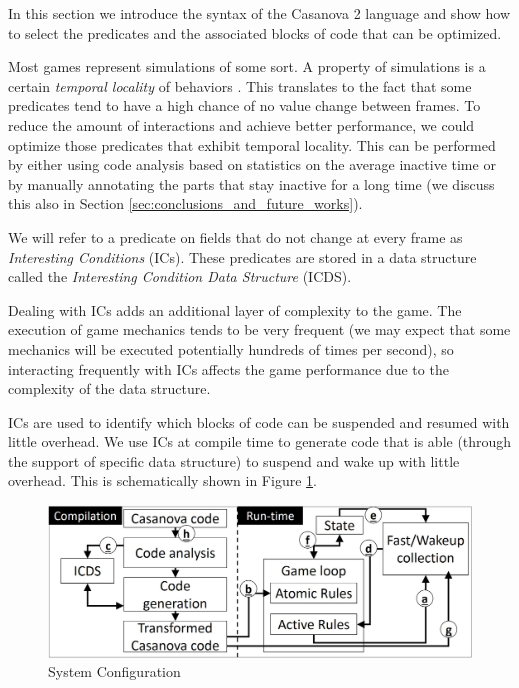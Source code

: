 In this section we introduce the syntax of the Casanova 2 language and show how to select the predicates and the associated blocks of code that can be optimized.

Most games represent simulations of some sort. A property of simulations is a certain \textit{temporal locality} of behaviors \cite{ai_dithering}. This translates to the fact that some predicates tend to have a high chance of no value change between frames. To reduce the amount of interactions and achieve better performance, we could optimize those predicates that exhibit temporal locality. This can be performed by either using code analysis based on statistics on the average inactive time or by manually annotating the parts that stay inactive for a long time (we discuss this also in Section \ref{sec:conclusions_and_future_works}).

We will refer to a predicate on fields that do not change at every frame as \textit{Interesting Conditions} (ICs). These predicates are stored in a data structure called the \textit{Interesting Condition Data Structure} (ICDS).

Dealing with ICs adds an additional layer of complexity to the game. The execution of game mechanics tends to be very frequent (we may expect that some mechanics will be executed potentially hundreds of times per second), so interacting frequently with ICs affects the game performance due to the complexity of the data structure.

ICs are used to identify which blocks of code can be suspended and resumed with little overhead. We use ICs at compile time to generate code that is able (through the support of specific data structure) to suspend and wake up with little overhead. This is schematically shown in Figure \ref{fig:system_configuration}.

\begin{figure}[!ht]
		\centering
         \includegraphics[width=1\textwidth]{Figures/system_description.jpg}
         \caption{System Configuration}
         \label{fig:system_configuration}
\end{figure}

